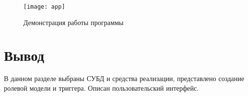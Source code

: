 \begin{figure}[ht!]\centering
	\texttt{[image: app]}
	\caption{Демонстрация работы программы}
	\label{app}
\end{figure}

\pagebreak

\section*{Вывод}

В данном разделе выбраны СУБД и средства реализации, представлено создание ролевой модели и триггера. Описан пользовательский интерфейс.

